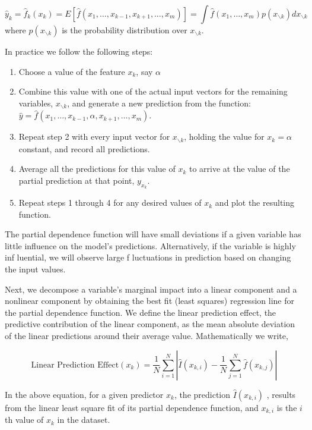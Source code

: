 \documentclass[
]{book}
\providecommand{\tightlist}{%
  \setlength{\itemsep}{0pt}\setlength{\parskip}{0pt}}
\begin{document}
\[
\hat{y}_k = \hat{f}_k(x_k) = E[\hat{f}(x_1, \dots, x_{k-1}, x_{k+1}, \dots, x_m)] = \int \hat{f}(x_1, \dots, x_m) p(x_{\backslash k}) dx_{\backslash k}
\]
where \(p(x_{\backslash k})\) is the probability distribution over \(x_{\backslash k}\).

In practice we follow the following steps:

\begin{enumerate}
\def\labelenumi{\arabic{enumi}.}
\tightlist
\item
  Choose a value of the feature \(x_k\), say \(\alpha\)
\item
  Combine this value with one of the actual input vectors for the remaining variables, \(x_{\backslash k}\), and generate a new prediction from the function: \(\hat{y} = \hat{f} (x_1, \dots, x_{k-1}, \alpha, x_{k+1}, \dots, x_m)\).
\item
  Repeat step 2 with every input vector for \(x_{\backslash k}\), holding the value for \(x_k = \alpha\) constant, and record all predictions.
\item
  Average all the predictions for this value of \(x_k\) to arrive at the value of the partial prediction at that point, \(y_{x_k}\).
\item
  Repeat steps 1 through 4 for any desired values of \(x_k\) and plot the resulting function.
\end{enumerate}

The partial dependence function will have small deviations if a given variable has little influence on the model's predictions. Alternatively, if the variable is highly inf luential, we will observe large f luctuations in prediction based on changing the input values.

Next, we decompose a variable's marginal impact into a linear component and a nonlinear component by obtaining the best fit (least squares) regression line for the partial dependence function. We define the linear prediction effect, the predictive contribution of the linear component, as the mean absolute deviation of the linear predictions around their average value. Mathematically we write,

\[\text{Linear Prediction Effect}(x_k) = \frac{1}{N} \sum^{N}_{i=1}\left| \hat{I}(x_{k,i}) - \frac{1}{N} \sum^{N}_{j=1} \hat{f}(x_{k,j}) \right|\]

In the above equation, for a given predictor \(x_k\), the prediction \(\hat{I}(x_{k,i})\) , results from the linear least square fit of its partial dependence function, and \(x_{k,i}\) is the \(i\)th value of \(x_k\) in the dataset.
\end{document}
